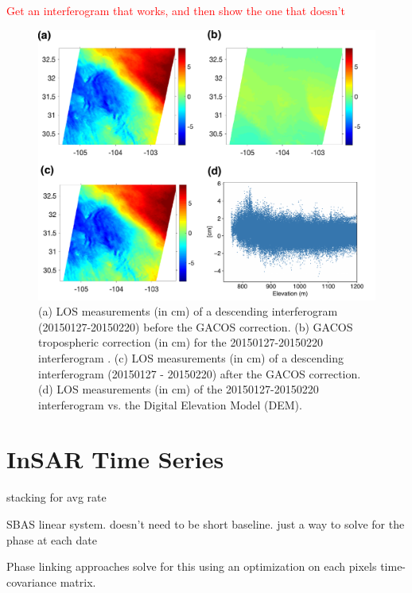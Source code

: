 \textcolor{red}{Get an interferogram that works, and then show the one that doesn't}

\begin{figure}
	\centering
	\includegraphics[width=\textwidth]{paper1-permian/figures/supplement/figureS4-gacos.pdf}		
	\caption[GACOS tropospheric corrections]{(a) LOS measurements (in cm) of a descending interferogram (20150127-20150220) before the GACOS correction. (b) GACOS tropospheric correction (in cm) for the 20150127-20150220 interferogram \citep{Yu2018InterferometricSyntheticAperture}. (c) LOS measurements (in cm) of a descending interferogram (20150127 - 20150220) after the GACOS correction. (d) LOS measurements (in cm) of the 20150127-20150220 interferogram vs. the Digital Elevation Model (DEM).}
	\label{fig:GACOS}
\end{figure}


\section{InSAR Time Series}
\label{sec:ch3-insar-ts}

stacking for avg rate

SBAS linear system. doesn't need to be short baseline. just a way to solve for the phase at each date

Phase linking approaches solve for this using an optimization on each pixels time-covariance matrix.



